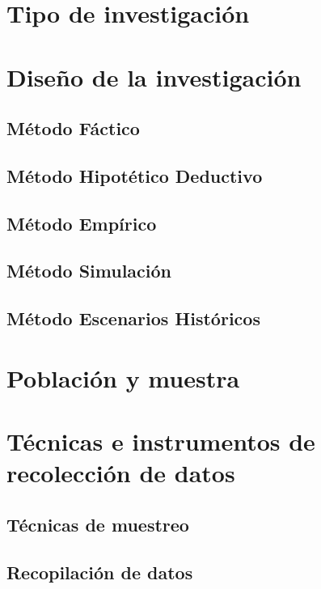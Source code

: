 \documentclass[12pt,a4paper,oneside]{book}
\begin{document}
\section{Tipo de investigación}

\section{Diseño de la investigación}

\subsection{Método Fáctico}
\subsection{Método Hipotético Deductivo}
\subsection{Método Empírico}
\subsection{Método Simulación}
\subsection{Método Escenarios Históricos}
%


\section{Población y muestra}

\newpage 

\section{Técnicas e instrumentos de recolección de datos}

\subsection{Técnicas de muestreo}

\subsection{Recopilación de datos}
\end{document}
